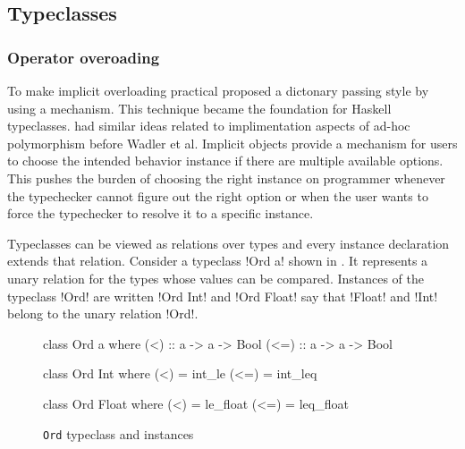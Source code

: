 \documentclass[manuscript,screen,nonacm]{acmart}
\begin{document}
\subsection{Typeclasses}
\subsubsection{Operator overoading}
To make implicit overloading practical \citet{wadler_polymorphism_1989} proposed a dictonary passing style by using a mechanism. This technique became the foundation for Haskell\cite{haskell_2010} typeclasses. \cite{kaes_parametric_1988} had similar ideas related to implimentation aspects of ad-hoc polymorphism before Wadler et al. Implicit objects\cite{oliveira_typeclasses_2010} provide a mechanism for users to choose the intended behavior instance if there are multiple available options. This pushes the burden of choosing the right instance on programmer whenever the typechecker cannot figure out the right option or when the user wants to force the typechecker to resolve it to a specific instance.

Typeclasses can be viewed as relations over types and every instance declaration extends that relation. Consider a typeclass !Ord a! shown in . It represents a unary relation for the types whose values can be compared. Instances of the typeclass !Ord! are written !Ord Int! and !Ord Float! say that !Float! and !Int! belong to the unary relation !Ord!.


\begin{figure}[ht]
  \centering
  \begin{minipage}[ht]{0.3\linewidth}
    \begin{code}
      class Ord a where
         (<)  :: a -> a -> Bool
         (<=) :: a -> a -> Bool
    \end{code}
  \end{minipage}%
  \begin{minipage}[ht]{0.3\linewidth}
    \begin{code}
      class Ord Int where
         (<)  = int_le
         (<=) = int_leq
    \end{code}
  \end{minipage}%
  \begin{minipage}[ht]{0.3\linewidth}
    \begin{code}
      class Ord Float where
         (<)  = le_float
         (<=) = leq_float
    \end{code}
  \end{minipage}
  \caption{\lstinline{Ord} typeclass and instances}
  \label{fig:tc-ord}
\end{figure}
\end{document}
